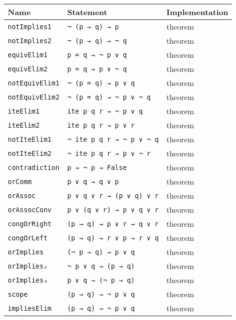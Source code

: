 \documentclass[
	msc,
	english
]{ppgccufmg}
\begin{document}
\begin{longtabu} to \textwidth { l l l }
\toprule
Name        & Statement & Implementation \\ \midrule
\texttt{notImplies1} & \texttt{¬ (p → q) → p} & theorem \\ \midrule
\texttt{notImplies2} & \texttt{¬ (p → q) → ¬ q}      & theorem        \\ \midrule
\texttt{equivElim1}  & \texttt{p = q → ¬ p ∨ q}      & theorem        \\ \midrule
\texttt{equivElim2}  & \texttt{p = q → p ∨ ¬ q}      & theorem        \\ \midrule
\texttt{notEquivElim1}  & \texttt{¬ (p = q) → p ∨ q}  & theorem        \\ \midrule
\texttt{notEquivElim2}  &  \texttt{¬ (p = q) → ¬ p ∨ ¬ q}      & theorem        \\ \midrule
\texttt{iteElim1} & \texttt{ite p q r → ¬ p ∨ q} & theorem \\ \midrule
\texttt{iteElim2} & \texttt{ite p q r → p ∨ r} & theorem \\ \midrule
\texttt{notIteElim1} & \texttt{¬ ite p q r → ¬ p ∨ ¬ q} & theorem \\ \midrule
\texttt{notIteElim2} & \texttt{¬ ite p q r → p ∨ ¬ r} & theorem \\ \midrule
\texttt{contradiction} & \texttt{p → ¬ p → False} & theorem \\ \midrule
\texttt{orComm} & \texttt{p ∨ q → q ∨ p} & theorem \\ \midrule
\texttt{orAssoc} & \texttt{p ∨ q ∨ r → (p ∨ q) ∨ r} & theorem \\ \midrule
\texttt{orAssocConv} & \texttt{p ∨ (q ∨ r) → p ∨ q ∨ r} & theorem \\ \midrule
\texttt{congOrRight} & \texttt{(p → q) → p ∨ r → q ∨ r} & theorem \\ \midrule
\texttt{congOrLeft} & \texttt{(p → q) → r ∨ p → r ∨ q} & theorem \\ \midrule
\texttt{orImplies} & \texttt{(¬ p → q) → p ∨ q} & theorem \\ \midrule
\texttt{orImplies₂} & \texttt{¬ p ∨ q → (p → q)} & theorem \\ \midrule
\texttt{orImplies₃} & \texttt{p ∨ q → (¬ p → q)} & theorem \\ \midrule
\texttt{scope} & \texttt{(p → q) → ¬ p ∨ q} & theorem \\ \midrule
\texttt{impliesElim} & \texttt{(p → q) → ¬ p ∨ q} & theorem        \\ \midrule

\end{longtabu}
\end{document}
